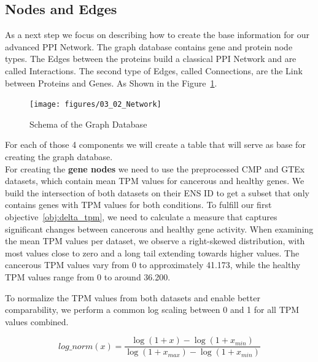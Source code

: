 \subsection{Nodes and Edges} \label{subsec:nodes_and_edges}

As a next step we focus on describing how to create the base information for our advanced PPI Network.
The graph database contains gene and protein node types.
The Edges between the proteins build a classical PPI Network and are called Interactions. %
The second type of Edges, called Connections, are the Link between Proteins and Genes.
As Shown in the Figure~\ref{fig:03_02_Network}.

\begin{figure}[h]
\centering
\texttt{[image: figures/03\_02\_Network]}
\caption{Schema of the Graph Database}
\label{fig:03_02_Network}
\end{figure}

For each of those 4 components we will create a table that will serve as base for creating the graph database.\\

For creating the \textbf{gene nodes} we need to use the preprocessed CMP and GTEx datasets,
which contain mean TPM values for cancerous and healthy genes.
We build the intersection of both datasets on their ENS ID to get a subset that only contains genes with TPM values for both conditions.
To fulfill our first objective~\ref{obj:delta_tpm},
we need to calculate a measure that captures significant changes between cancerous and healthy gene activity.
When examining the mean TPM values per dataset, we observe a right-skewed distribution, with most values close to zero
and a long tail extending towards higher values.
The cancerous TPM values vary from 0 to approximately 41.173, while the healthy TPM values range from 0 to around 36.200.



To normalize the TPM values from both datasets and enable better comparability, we perform a common log scaling between 0 and 1 for all TPM values combined.

\begin{equation}
\label{eq:tpm_normalization}
log\_norm(x) = \frac{\log(1 + x) - \log(1 + x_{min})}{\log(1 + x_{max}) - \log(1 + x_{min})}
\end{equation}

